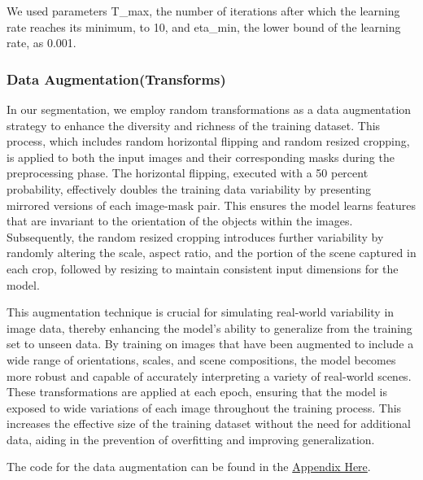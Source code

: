 \documentclass{article}
\begin{document}
We used parameters T\_max, the number of iterations after which the learning rate reaches its minimum, to 10, and eta\_min, the lower bound of the learning rate, as 0.001. 

\subsubsection{Data Augmentation(Transforms)}
In our segmentation, we employ random transformations as a
data augmentation strategy to enhance the diversity and richness of the training
dataset. This process, which includes random horizontal flipping and random
resized cropping, is applied to both the input images and their corresponding
masks during the preprocessing phase. The horizontal flipping, executed with a
50 percent probability, effectively doubles the training data variability by presenting
mirrored versions of each image-mask pair. This ensures the model learns features
that are invariant to the orientation of the objects within the images. Subsequently,
the random resized cropping introduces further variability by randomly altering
the scale, aspect ratio, and the portion of the scene captured in each crop,
followed by resizing to maintain consistent input dimensions for the model.

This augmentation technique is crucial for simulating real-world variability
in image data, thereby enhancing the model's ability to generalize from the
training set to unseen data. By training on images that have been augmented
to include a wide range of orientations, scales, and scene compositions, the
model becomes more robust and capable of accurately interpreting a variety of
real-world scenes. These transformations are applied at each epoch,
ensuring that the model is exposed to wide variations of each
image throughout the training process. This increases
the effective size of the training dataset without the need for additional data,
aiding in the prevention of overfitting and improving generalization.

The code for the data augmentation can be found in the \href{sec:data_augmentation_code}{Appendix Here}.
\end{document}

